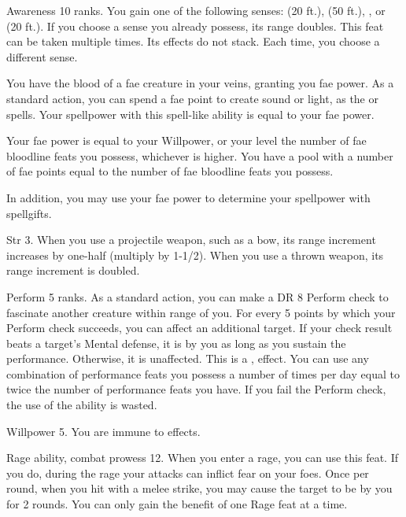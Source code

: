 \featpre Awareness 10 ranks.
\featben You gain one of the following senses:  (20 ft.),  (50 ft.), , or  (20 ft.).
If you choose a sense you already possess, its range doubles.
 This feat can be taken multiple times.
Its effects do not stack.
Each time, you choose a different sense.

\featben You have the blood of a fae creature in your veins, granting you fae power.
As a standard action, you can spend a fae point to create sound or light, as the  or  spells.
Your spellpower with this spell-like ability is equal to your fae power.

Your fae power is equal to your Willpower, or your level \add the number of fae bloodline feats you possess, whichever is higher.
You have a pool with a number of fae points equal to the number of fae bloodline feats you possess.

In addition, you may use your fae power to determine your spellpower with spellgifts.

\featpre Str 3.
\featben When you use a projectile weapon, such as a bow, its range increment increases by one-half (multiply by 1-1/2).
When you use a thrown weapon, its range increment is doubled.

\featpre Perform 5 ranks.
\featben As a standard action, you can make a DR 8 Perform check to fascinate another creature within \rngmed range of you.
For every 5 points by which your Perform check succeeds, you can affect an additional target.
If your check result beats a target's Mental defense, it is \fascinated by you as long as you sustain the performance.
Otherwise, it is unaffected.
This is a ,  effect.
You can use any combination of performance feats you possess a number of times per day equal to twice the number of performance feats you have.
If you fail the Perform check, the use of the ability is wasted.

\featpre Willpower 5.
\featben You are immune to  effects.

\featpres Rage ability, combat prowess 12.
\featben When you enter a rage, you can use this feat. If you do, during the rage your attacks can inflict fear on your foes.
Once per round, when you hit with a melee strike, you may cause the target to be \shaken by you for 2 rounds.
 You can only gain the benefit of one Rage feat at a time.

